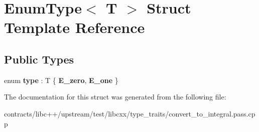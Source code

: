 \hypertarget{struct_enum_type}{}\section{Enum\+Type$<$ T $>$ Struct Template Reference}
\label{struct_enum_type}
\subsection*{Public Types}
\begin{DoxyCompactItemize}
\item 
\mbox{\label{struct_enum_type_ab4fd19d84a2fd8cb09a276273a508460}} 
enum {\bfseries type} \+: T \{ {\bfseries E\+\_\+zero}, 
{\bfseries E\+\_\+one}
 \}
\end{DoxyCompactItemize}


The documentation for this struct was generated from the following file\+:\begin{DoxyCompactItemize}
\item 
contracts/libc++/upstream/test/libcxx/type\+\_\+traits/convert\+\_\+to\+\_\+integral.\+pass.\+cpp\end{DoxyCompactItemize}
